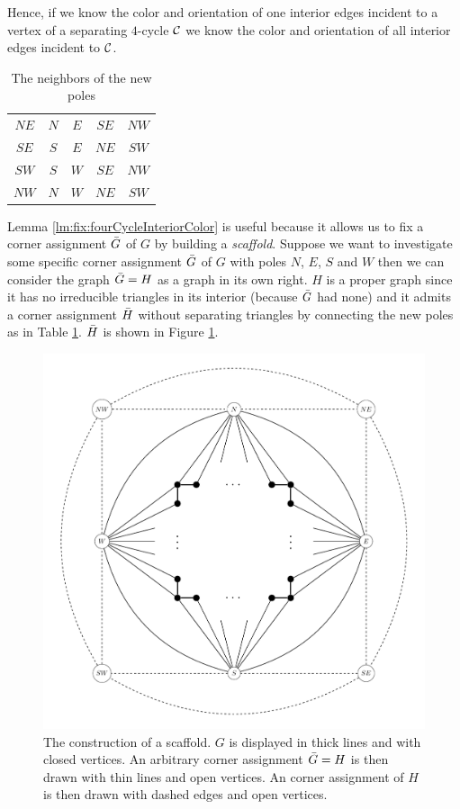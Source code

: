  Hence, if we know the color and orientation of one interior edges incident to a vertex of a separating $4$-cycle $\mathcal{C}$ we know the color and orientation of all interior edges incident to $\mathcal{C}$.

  \begin{table}
    \centering
    \begin{tabular}{c|| c c c c}
      $NE$ & $N$ & $ E$ & $ SE$ & $ NW$ \\
      $SE$ & $S$ & $ E$ & $ NE$ & $ SW$\\
      $SW$ & $S$ & $ W$ & $ SE$ & $ NW$\\
      $NW$ & $N$ & $ W$ & $ NE$ & $ SW$\\
    \end{tabular}
    \caption{The neighbors of the new poles}
    \label{tab:scaffold}
  \end{table}

  Lemma \ref{lm:fix:fourCycleInteriorColor} is useful because it allows us to fix a corner assignment $\bar{G}$ of $G$ by building a \emph{scaffold}. Suppose we want to investigate some specific corner assignment $\bar{G}$ of $G$ with poles $N$, $E$, $S$ and $W$ then we can consider the graph $\bar{G} = H$ as a graph in its own right.
   $H$ is a proper graph since it has no irreducible triangles in its interior (because $\bar{G}$ had none) and it admits a corner assignment $\bar{H}$ without separating triangles by connecting the new poles as in Table \ref{tab:scaffold}. $\bar{H}$ is shown in Figure \ref{fig:scafold}.

  \begin{figure}[h!]
  \centering
  \includegraphics[scale=0.5]{fixExtension/img/scafold}

  \caption{The construction of a scaffold. $G$ is displayed in thick lines and with closed vertices. An arbitrary corner assignment $\bar{G} =H$ is then drawn with thin lines and open vertices. An corner assignment of $H$ is then drawn with dashed edges and open vertices.
      \label{fig:scafold}}
  \end{figure}


